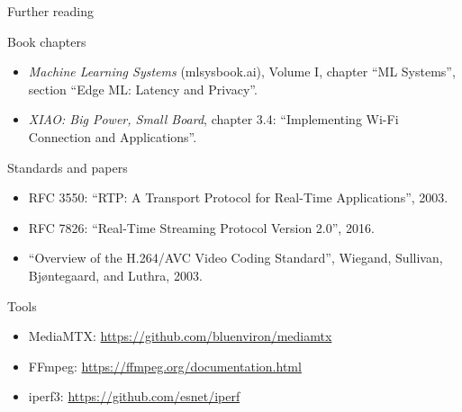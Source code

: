 \begin{frame}{Further reading}
  \footnotesize
  \begin{block}{Book chapters}
    \begin{itemize}
      \item \emph{Machine Learning Systems} (mlsysbook.ai), Volume I, chapter
            ``ML Systems'', section ``Edge ML: Latency and Privacy''.
      \item \emph{XIAO: Big Power, Small Board}, chapter 3.4: ``Implementing
            Wi-Fi Connection and Applications''.
    \end{itemize}
  \end{block}
  \begin{block}{Standards and papers}
    \begin{itemize}
      \item RFC 3550: ``RTP: A Transport Protocol for Real-Time
            Applications'', 2003.
      \item RFC 7826: ``Real-Time Streaming Protocol Version 2.0'', 2016.
      \item ``Overview of the H.264/AVC Video Coding Standard'', Wiegand,
            Sullivan, Bj{\o}ntegaard, and Luthra, 2003.
    \end{itemize}
  \end{block}
  \begin{block}{Tools}
    \begin{itemize}
      \item MediaMTX: \url{https://github.com/bluenviron/mediamtx}
      \item FFmpeg: \url{https://ffmpeg.org/documentation.html}
      \item iperf3: \url{https://github.com/esnet/iperf}
    \end{itemize}
  \end{block}
\end{frame}
